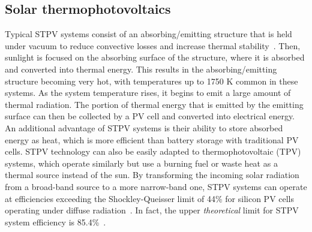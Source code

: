 \documentclass[10pt,letterpaper]{article}
\begin{document}
\subsection{Solar thermophotovoltaics}
Typical STPV systems consist of an absorbing/emitting structure that is held under vacuum to reduce convective losses and increase thermal stability~\cite{global_opt, convection}.  Then, sunlight is focused on the absorbing surface of the structure, where it is absorbed and converted into thermal energy.  This results in the absorbing/emitting structure becoming very hot, with temperatures up to 1750 K common in these systems.  As the system temperature rises, it begins to emit a large amount of thermal radiation.  The portion of thermal energy that is emitted by the emitting surface can then be collected by a PV cell and converted into electrical energy.  An additional advantage of STPV systems is their ability to store absorbed energy as heat, which is more efficient than battery storage with traditional PV cells.  STPV technology can also be easily adapted to thermophotovoltaic (TPV) systems, which operate similarly but use a burning fuel or waste heat as a thermal source instead of the sun. By transforming the incoming solar radiation from a broad-band source to a more narrow-band one, STPV systems can operate at efficiencies exceeding the Shockley-Queisser limit of 44\% for silicon PV cells operating under diffuse radiation~\cite{SQ}.  In fact, the upper {\it theoretical} limit for STPV system efficiency is 85.4\%~\cite{A2}.
\end{document}
